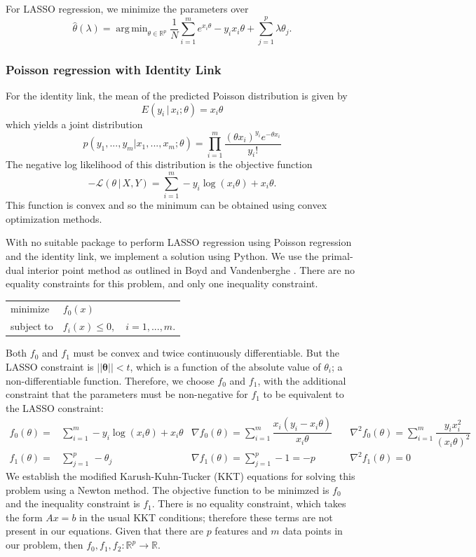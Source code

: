 \documentclass[11pt]{article}
\DeclareMathOperator*{\argmin}{arg\,min}
\begin{document}
For LASSO regression, we minimize the parameters \cite{Young2007} over  
\[\hat{\theta}(\lambda) = \argmin_{\theta\in\mathbb{R}^p}  \frac{1}{N}\sum_{i=1}^m e^{x_i\theta}-y_ix_i\theta  + \sum_{j=1}^p\lambda\theta_j.\]

\subsubsection{Poisson regression with Identity Link}

For the identity link, the mean of the predicted Poisson distribution is given by $$E(y_i\,|\,x_i;\theta) = x_i\theta$$ which yields a joint distribution 
$$p(y_1,...,y_m|x_1,...,x_m;\theta) = \prod_{i=1}^m \frac{\left(\theta x_i\right)^{y_i}e^{-\theta x_i}}{y_i!} $$
The negative log likelihood of this distribution is the objective function
$$-\mathcal{L}\left(\theta\,|\,X, Y\right) = \sum_{i=1}^m -y_i\log{\left(x_i\theta\right)} +x_i\theta. $$ This function is convex and so the minimum can be obtained using convex optimization methods. 

With no suitable package to perform LASSO regression using Poisson regression and the identity link, we implement a solution using Python. We use the primal-dual interior point method as outlined in Boyd and Vandenberghe \cite{Boyd2004}. There are no equality constraints for this problem, and only one inequality constraint.

\begin{center}\begin{tabular}{ll}
minimize &$f_0(x)$\\
subject to &$f_i(x) \leq 0, \quad i = 1, ..., m$.
\end{tabular}\end{center}


Both $f_0$ and $f_1$ must be convex and twice continuously differentiable. But the LASSO constraint is $||\boldsymbol{\theta}|| < t$, which is a function of the absolute value of $\theta_i$; a non-differentiable function. Therefore, we choose $f_0$ and $f_1$, with the additional constraint that the parameters must be non-negative for $f_1$ to be equivalent to the LASSO constraint:
\begin{align}
f_0(\theta) =& \sum_{i=1}^m -y_i\log{\left(x_i\theta\right)} +x_i\theta
&\nabla f_0(\theta) = \sum_{i=1}^m \dfrac{x_i\left(y_i-x_i\theta\right)}{x_i\theta}\quad
&\nabla^2 f_0(\theta) = \sum_{i=1}^m\dfrac{y_i x_i^2}{\left(x_i\theta\right)^2}\label{eq:objective}\\[0.2in]
f_1(\theta) =& \sum_{j=1}^p\,-\theta_j
&\nabla f_1(\theta) = \sum_{j=1}^p -1 = -p\quad
&\nabla^2 f_1(\theta) = 0\label{eq:constraints}
\end{align}
We establish the modified Karush-Kuhn-Tucker (KKT) equations for solving this problem using a Newton method. The objective function to be minimzed is $f_0$ and the inequality constraint is $f_1$. There is no equality constraint, which takes the form $Ax = b$ in the usual KKT conditions; therefore these terms are not present in our equations. Given that there are $p$ features and $m$ data points in our problem, then $f_0, f_1, f_2: \mathbb{R}^p \rightarrow \mathbb{R}.$ 
\end{document}

